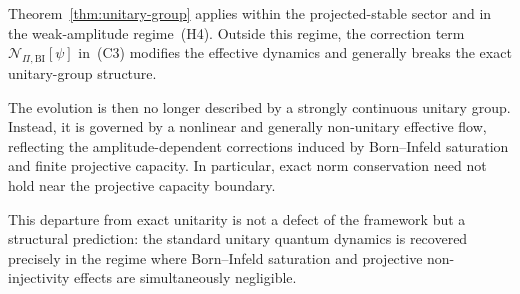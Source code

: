     \begin{remark}
  Theorem~\ref{thm:unitary-group} applies within the projected-stable sector and in the
  weak-amplitude regime~(H4).
  Outside this regime, the correction term $\mathcal{N}_{\Pi,\mathrm{BI}}[\psi]$ in~(C3)
  modifies the effective dynamics and generally breaks the exact unitary-group structure.

  The evolution is then no longer described by a strongly continuous unitary group.
  Instead, it is governed by a nonlinear and generally non-unitary effective flow,
  reflecting the amplitude-dependent corrections induced by Born--Infeld saturation
  and finite projective capacity.
  In particular, exact norm conservation need not hold near the projective capacity boundary.

  This departure from exact unitarity is not a defect of the framework but a structural
  prediction: the standard unitary quantum dynamics is recovered precisely in the regime
  where Born--Infeld saturation and projective non-injectivity effects are simultaneously
  negligible.
    \end{remark}
